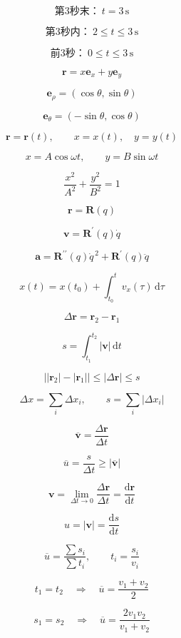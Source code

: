\documentclass[12pt]{article}
\begin{document}
\[
\text{第3秒末：}\ t=3\,\mathrm s
\]

\[
\text{第3秒内：}\ 2\le t\le3\,\mathrm s
\]

\[
\text{前3秒：}\ 0\le t\le3\,\mathrm s
\]

\[
\boldsymbol r=x\boldsymbol e_x+y\boldsymbol e_y
\]

\[
\boldsymbol e_\rho=(\cos\theta,\sin\theta)
\]

\[
\boldsymbol e_\theta=(-\sin\theta,\cos\theta)
\]

\[
\boldsymbol r=\boldsymbol r(t),\qquad x=x(t),\quad y=y(t)
\]

\[
x=A\cos\omega t,\qquad y=B\sin\omega t
\]

\[
\frac{x^2}{A^2}+\frac{y^2}{B^2}=1
\]

\[
\boldsymbol r=\boldsymbol R(q)
\]

\[
\boldsymbol v=\boldsymbol R^{\prime}(q)\dot q
\]

\[
\boldsymbol a=\boldsymbol R^{\prime\prime}(q)\dot q^{\,2} +\boldsymbol R^{\prime}(q)\ddot q
\]

\[
x(t)=x(t_0)+\int_{t_0}^t v_x(\tau)\,\mathrm d\tau
\]

\[
\Delta\boldsymbol r=\boldsymbol r_2-\boldsymbol r_1
\]

\[
s=\int_{t_1}^{t_2}|\boldsymbol v|\,\mathrm dt
\]

\[
\bigl||\boldsymbol r_2|-|\boldsymbol r_1|\bigr|\le|\Delta\boldsymbol r|\le s
\]

\[
\Delta x=\sum_i\Delta x_i,\qquad s=\sum_i|\Delta x_i|
\]

\[
\overline{\boldsymbol v}=\frac{\Delta\boldsymbol r}{\Delta t}
\]

\[
\overline u=\frac{s}{\Delta t}\ge|\overline{\boldsymbol v}|
\]

\[
\boldsymbol v=\lim_{\Delta t\to0} \frac{\Delta\boldsymbol r}{\Delta t}=\frac{\mathrm d\boldsymbol r}{\mathrm dt}
\]

\[
u=|\boldsymbol v|=\frac{\mathrm ds}{\mathrm dt}
\]

\[
\overline u=\frac{\sum s_i}{\sum t_i},\qquad t_i=\frac{s_i}{v_i}
\]

\[
t_1=t_2\quad\Longrightarrow\quad\overline u=\frac{v_1+v_2}{2}
\]

\[
s_1=s_2\quad\Longrightarrow\quad\overline u=\frac{2v_1v_2}{v_1+v_2}
\]
\end{document}
